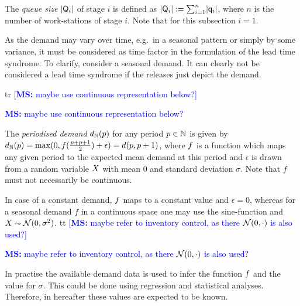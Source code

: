 \documentclass[mnsc]{informs3}
\newcommand\MS[2][r]{\ifx t#1 \textcolor{blue}{[\textbf{MS:} #2]}
  \else \begin{center}\textcolor{blue}{\textbf{MS:} #2} \end{center} \fi}
\begin{document}
\begin{definition}

  The \emph{queue size} $\lvert{\mathsf{Q}_{i}}\rvert$ of stage $i$ is defined as
  $\lvert{\mathsf{Q}_{i}}\rvert \mathrel{:=} \sum_{i=1}^{n} \lvert{\mathsf{q}_{i}}\rvert$, where $n$ is the number of work-stations of stage
  $i$. Note that for this subsection $i=1$.

\end{definition}


As the demand may vary over time, e.g.~in a seasonal pattern or simply by some variance, it must be
considered as time factor in the formulation of the lead time syndrome. To clarify, consider a
seasonal demand. It can clearly not be considered a lead time syndrome if the releases just depict
the demand.

\MS{maybe use continuous representation below?}

\begin{definition}
  The \emph{periodised demand} ${d_{\mathbb{N}}}(p)$ for any period $p \in \mathbb{N}$ is given by
  ${d_{\mathbb{N}}}(p) = \max(0,{f}(\frac{p+p+1}{2}) + \epsilon) = {d}(p,p+1)$, where ${f}$ is a
  function which maps any given period to the expected mean demand at this period and $\epsilon$ is
  drawn from a random variable $X$ with mean $0$ and standard deviation $\sigma$. Note that $f$
  must not necessarily be continuous.
\end{definition}


\begin{example}
  In case of a constant demand, ${f}$ maps to a constant value and $\epsilon = 0$, whereas for a
  seasonal demand $f$ in a continuous space one may use the sine-function and
  $X \sim \mathcal{N}(0,\sigma^{2})$.
  \MS[t]{maybe refer to inventory control, as there $\mathcal{N}(0,\cdot)$ is also used?}

\end{example}

In practise the available demand data is used to infer the function ${f}$ and the value for
$\sigma$. This could be done using regression and statistical analyses. Therefore, in hereafter
these values are expected to be known.
\end{document}
